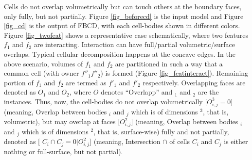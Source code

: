
Cells do not overlap volumetrically but can touch others at the boundary faces, only fully, but not partially.   Figure \ref{fig_beforecd} is the input model and Figure \ref{fig_cd} is the output of FBCD, with each cell-bodies shown in different colors. Figure \ref{fig_twofeat} shows a representative case schematically, where two features $f_1$ and $f_2$ are interacting. Interaction can have full/partial volumetric/surface overlaps. Typical cellular decomposition happens at the concave edges. In the above scenario, volumes of $f_1$ and $f_2$ are partitioned in such a way that a common cell (with owner $f''_1f''_2$) is formed (Figure \ref{fig_featinteract}). Remaining portion of $f_1$ and $f_2$ are termed as $f'_1$ and $f'_2$ respectively.  Overlapping faces are denoted as $O_1$ and $O_2$, where $O$ denotes ``Overlapp'' and $_1$ and $_2$ are the instances. Thus, now, the cell-bodies do not overlap volumetrically [$O_{i,j}^3 = 0$] (meaning, Overlap between bodies $_i$ and $_j$ which is of dimensions $^3$, that is, volumetric), but may overlap at faces [$O_{i,j}^2$] (meaning, Overlap between bodies $_i$ and $_j$ which is of dimensions $^2$, that is, surface-wise) fully and not partially, denoted as [ $C_i \cap C_j = 0| O_{i,j}^2$] (meaning, Intersection $\cap$ of cells $C_i$ and $C_j$ is either nothing or full-surface, but not partial).



